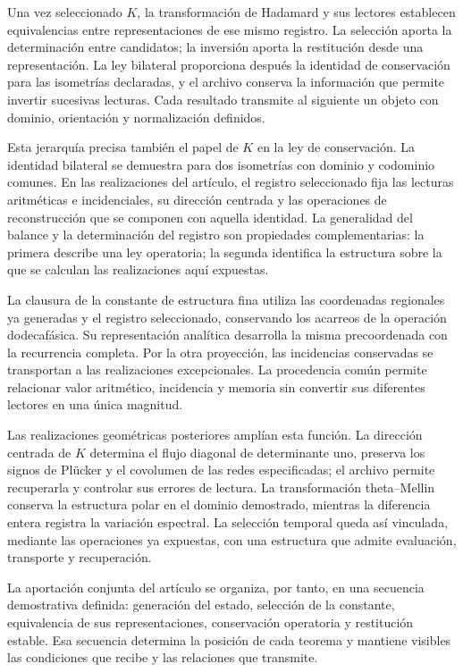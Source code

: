 Una vez seleccionado \(K\), la transformación de Hadamard y sus lectores
establecen equivalencias entre representaciones de ese mismo registro.
La selección aporta la determinación entre candidatos; la inversión
aporta la restitución desde una representación. La ley bilateral
proporciona después la identidad de conservación para las isometrías
declaradas, y el archivo conserva la información que permite invertir
sucesivas lecturas. Cada resultado transmite al siguiente un objeto con
dominio, orientación y normalización definidos.

Esta jerarquía precisa también el papel de \(K\) en la ley de
conservación. La identidad bilateral se demuestra para dos isometrías
con dominio y codominio comunes. En las realizaciones del artículo, el
registro seleccionado fija las lecturas aritméticas e incidenciales,
su dirección centrada y las operaciones de reconstrucción que se
componen con aquella identidad. La generalidad del balance y la
determinación del registro son propiedades complementarias: la primera
describe una ley operatoria; la segunda identifica la estructura sobre
la que se calculan las realizaciones aquí expuestas.

La clausura de la constante de estructura fina utiliza las coordenadas
regionales ya generadas y el registro seleccionado, conservando los
acarreos de la operación dodecafásica. Su representación analítica
desarrolla la misma precoordenada con la recurrencia completa. Por la
otra proyección, las incidencias conservadas se transportan a las
realizaciones excepcionales. La procedencia común permite relacionar
valor aritmético, incidencia y memoria sin convertir sus diferentes
lectores en una única magnitud.

Las realizaciones geométricas posteriores amplían esta función. La
dirección centrada de \(K\) determina el flujo diagonal de determinante
uno, preserva los signos de Plücker y el covolumen de las redes
especificadas; el archivo permite recuperarla y controlar sus errores de
lectura. La transformación theta--Mellin conserva la estructura polar en
el dominio demostrado, mientras la diferencia entera registra la
variación espectral. La selección temporal queda así vinculada, mediante
las operaciones ya expuestas, con una estructura que admite evaluación,
transporte y recuperación.

La aportación conjunta del artículo se organiza, por tanto, en una
secuencia demostrativa definida: generación del estado, selección de la
constante, equivalencia de sus representaciones, conservación operatoria
y restitución estable. Esa secuencia determina la posición de cada
teorema y mantiene visibles las condiciones que recibe y las relaciones
que transmite.
